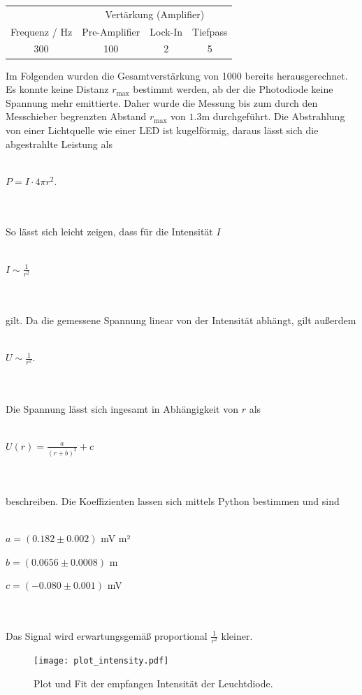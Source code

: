 \begin{table}[!htp]
  \centering
  \begin{tabular}{cccc}
    \toprule
     & \multicolumn{3}{c}{Vertärkung (Amplifier)} \\
    Frequenz / Hz & Pre-Amplifier & Lock-In & Tiefpass \\
    \midrule
    300 & 100 & 2 & 5 \\
    \bottomrule
  \end{tabular}
\end{table}

Im Folgenden wurden die Gesamtverstärkung von 1000 bereits herausgerechnet. Es konnte keine Distanz $r_\text{max}$ bestimmt werden, ab der die Photodiode keine Spannung mehr emittierte. Daher wurde die Messung bis zum durch den Messchieber begrenzten Abstand $r_\text{max}$ von $1.3$m durchgeführt.
Die Abstrahlung von einer Lichtquelle wie einer LED ist kugelförmig, daraus lässt sich die abgestrahlte Leistung als
\\ \\
\centerline{$P = I\cdot 4\pi r^2$.}
\\ \\
So lässt sich leicht zeigen, dass für die Intensität $I$
\\ \\
\centerline{$I\sim \frac{1}{r^2}$}
\\ \\
gilt. Da die gemessene Spannung linear von der Intensität abhängt, gilt außerdem
\\ \\
\centerline{$U\sim \frac{1}{r^2}$.}
\\ \\
Die Spannung lässt sich ingesamt in Abhängigkeit von $r$ als
\\ \\
\centerline{$U(r) = \frac{a}{(r+b)^2} +c$}
\\ \\
beschreiben. Die Koeffizienten lassen sich mittels Python bestimmen und sind
\\ \\
\centerline{$a=(0.182\pm 0.002)$ \!mV m²}
\centerline{$b=(0.0656\pm 0.0008)$ \!m}
\centerline{$c=(-0.080\pm 0.001)$ \!mV}
\\ \\
Das Signal wird erwartungsgemäß proportional $\frac{1}{r^2}$ kleiner.



\begin{figure}
  \centering
  \texttt{[image: plot\_intensity.pdf]}
  \caption{Plot und Fit der empfangen Intensität der Leuchtdiode.}
  \label{fig:plot_intensity}
\end{figure}
